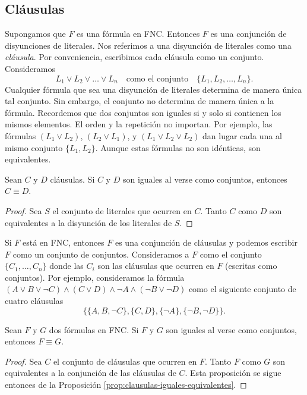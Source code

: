 \documentclass[12pt,a4paper]{book}
\begin{document}
    \subsection{Cláusulas}

    Supongamos que $F$ es una fórmula en FNC. Entonces $F$ es una conjunción de disyunciones de literales. Nos referimos a
    una disyunción de literales como una \textit{cláusula}. Por conveniencia, escribimos cada cláusula como un conjunto.
    Consideramos
    \begin{equation*}
        L_{1}\vee L_{2}\vee\dots\vee L_{n}\quad\text{como el conjunto}\quad\{L_{1},L_{2},\dots,L_{n}\}.
    \end{equation*}
    Cualquier fórmula que sea una disyunción de literales determina de manera única tal conjunto. Sin embargo, el conjunto no
    determina de manera única a la fórmula. Recordemos que dos conjuntos son iguales si y solo si contienen los mismos
    elementos. El orden y la repetición no importan. Por ejemplo, las fórmulas $(L_{1}\vee L_{2})$, $(L_{2}\vee L_{1})$, y
    $(L_{1}\vee L_{2}\vee L_{2})$ dan lugar cada una al mismo conjunto $\{L_{1},L_{2}\}$. Aunque estas fórmulas no son
    idénticas, son equivalentes.

    \begin{proposicion}\label{prop:clausulas-iguales-equivalentes}
        Sean $C$ y $D$ cláusulas. Si $C$ y $D$ son iguales al verse como conjuntos, entonces $C\equiv D$.
    \end{proposicion}
    \begin{proof}
        Sea $S$ el conjunto de literales que ocurren en $C$. Tanto $C$ como $D$ son equivalentes a la disyunción de los
        literales de $S$.
    \end{proof}

    Si $F$ está en FNC, entonces $F$ es una conjunción de cláusulas y podemos escribir $F$ como un conjunto de conjuntos.
    Consideramos a $F$ como el conjunto $\{C_{1},\dots,C_{n}\}$ donde las $C_{i}$ son las cláusulas que ocurren en $F$
    (escritas como conjuntos). Por ejemplo, consideramos la fórmula
    $(A\vee B\vee\neg C)\wedge(C\vee D)\wedge\neg A\wedge(\neg B\vee\neg D)$ como el siguiente conjunto de cuatro cláusulas
    \begin{equation*}
        \{\{A,B,\neg C\},\{C,D\},\{\neg A\},\{\neg B,\neg D\}\}.
    \end{equation*}

    \begin{proposicion}\label{prop:formulas-fnc-iguales-equivalentes}
        Sean $F$ y $G$ dos fórmulas en FNC. Si $F$ y $G$ son iguales al verse como conjuntos, entonces $F\equiv G$.
    \end{proposicion}
    \begin{proof}
        Sea $C$ el conjunto de cláusulas que ocurren en $F$. Tanto $F$ como $G$ son equivalentes a la conjunción de las
        cláusulas de $C$. Esta proposición se sigue entonces de la Proposición \ref{prop:clausulas-iguales-equivalentes}.
    \end{proof}
\end{document}
